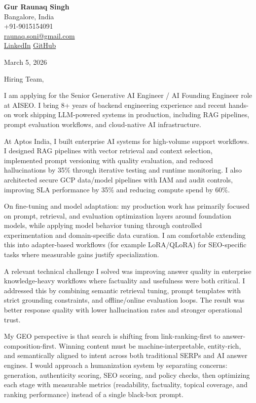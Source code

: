 \documentclass[11pt]{article}
\begin{document}
\textbf{Gur Raunaq Singh}\\
Bangalore, India\\
+91-9015154091\\
\href{mailto:raunaq.soni@gmail.com}{raunaq.soni@gmail.com}\\
\href{https://www.linkedin.com/in/gurraunaqsingh/}{LinkedIn} \textbar{} \href{https://github.com/raunaqness}{GitHub}

March 5, 2026

Hiring Team,

I am applying for the Senior Generative AI Engineer / AI Founding Engineer role at AISEO. I bring 8+ years of backend engineering experience and recent hands-on work shipping LLM-powered systems in production, including RAG pipelines, prompt evaluation workflows, and cloud-native AI infrastructure.

At Aptos India, I built enterprise AI systems for high-volume support workflows. I designed RAG pipelines with vector retrieval and context selection, implemented prompt versioning with quality evaluation, and reduced hallucinations by 35\% through iterative testing and runtime monitoring. I also architected secure GCP data/model pipelines with IAM and audit controls, improving SLA performance by 35\% and reducing compute spend by 60\%.

On fine-tuning and model adaptation: my production work has primarily focused on prompt, retrieval, and evaluation optimization layers around foundation models, while applying model behavior tuning through controlled experimentation and domain-specific data curation. I am comfortable extending this into adapter-based workflows (for example LoRA/QLoRA) for SEO-specific tasks where measurable gains justify specialization.

A relevant technical challenge I solved was improving answer quality in enterprise knowledge-heavy workflows where factuality and usefulness were both critical. I addressed this by combining semantic retrieval tuning, prompt templates with strict grounding constraints, and offline/online evaluation loops. The result was better response quality with lower hallucination rates and stronger operational trust.

My GEO perspective is that search is shifting from link-ranking-first to answer-composition-first. Winning content must be machine-interpretable, entity-rich, and semantically aligned to intent across both traditional SERPs and AI answer engines. I would approach a humanization system by separating concerns: generation, authenticity scoring, SEO scoring, and policy checks, then optimizing each stage with measurable metrics (readability, factuality, topical coverage, and ranking performance) instead of a single black-box prompt.
\end{document}
